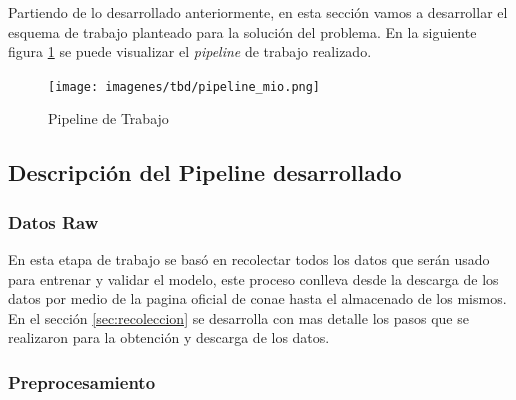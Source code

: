 Partiendo de lo desarrollado anteriormente, en esta sección vamos a desarrollar el esquema de trabajo planteado para la solución del problema. En la siguiente figura \ref{Fig:pipeline-mio} se puede visualizar el \textit{pipeline} de trabajo realizado.

\begin{figure}[H] \centering
  \texttt{[image: imagenes/tbd/pipeline\_mio.png]}
  \caption{Pipeline de Trabajo}\label{Fig:pipeline-mio}
\end{figure}

\subsection{Descripción del Pipeline desarrollado}\label{sub:desc-pipeline}

\subsubsection*{Datos Raw}
En esta etapa de trabajo se basó en recolectar todos los datos que serán usado para entrenar y validar el modelo, este proceso conlleva desde la descarga de los datos por medio de la pagina oficial de \ac{conae} hasta el almacenado de los mismos. En el sección \ref{sec:recoleccion} se desarrolla con mas detalle los pasos que se realizaron para la obtención y descarga de los datos.



%
\subsubsection*{Preprocesamiento}

